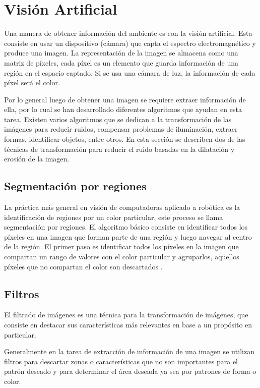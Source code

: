 \section{Visión Artificial} \label{sect:Vision_Artificial}

Una manera de obtener información del ambiente es con la visión artificial. Esta consiste en usar un dispositivo (cámara) que
capta el espectro electromagnético y produce una imagen. La representación de la imagen se almacena como una matriz de píxeles,
cada píxel es un elemento que guarda información de una región en el espacio captado. Si se usa una cámara de luz, la información
de cada píxel será el color. \cite{AiRobotics}  

Por lo general luego de obtener una imagen se requiere extraer información de ella, por lo cual se han desarrollado diferentes
algoritmos que ayudan en esta tarea. Existen varios algoritmos que se dedican a la transformación de las imágenes para reducir
ruidos, compensar problemas de iluminación, extraer formas, identificar objetos, entre otros. En esta sección se describen dos
de las técnicas de transformación para reducir el ruido basadas en la dilatación y erosión de la imagen. 
\subsection{Segmentaci\'on por regiones}

La pr\'actica m\'as general en visi\'on de computadoras aplicado a rob\'otica es la identificaci\'on de regiones por un color particular, este proceso se llama segmentaci\'on por regiones. El algoritmo b\'asico consiste en identificar todos los p\'ixeles en una imagen que forman parte de una regi\'on y luego navegar al centro de la regi\'on. El primer paso es identificar todos los p\'ixeles en la imagen que compartan un rango de valores con el color particular y agruparlos, aquellos p\'ixeles que no compartan el color son descartados \cite{BookOpenCv}. 

\subsection{Filtros }
El filtrado de imágenes es una técnica para la transformación de imágenes, que consiste en destacar  sus características más relevantes en base a un propósito en particular. 

Generalmente en la tarea de extracción de información de una imagen se utilizan filtros para descartar zonas o características que no son importantes para el patrón deseado y para determinar el área deseada ya sea por patrones de forma o color.

